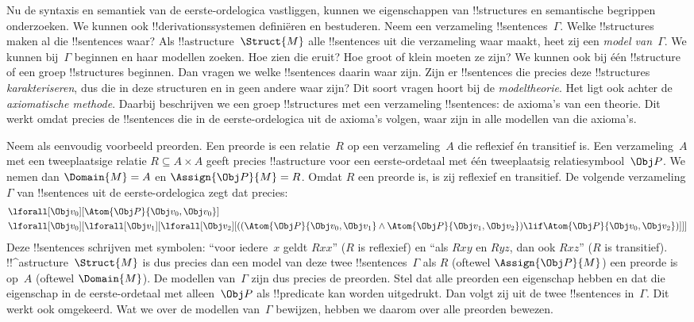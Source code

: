 \documentclass[../../../include/open-logic-section]{subfiles}
\begin{document}


Nu de syntaxis en semantiek van de eerste-ordelogica vastliggen, kunnen
we eigenschappen van !!{structure}s en semantische begrippen
onderzoeken. We kunnen ook !!{derivation}ssystemen definiëren en
bestuderen. Neem een verzameling !!{sentence}s~$\Gamma$. Welke
!!{structure}s maken al die !!{sentence}s waar? Als
!!a{structure}~$\Struct{M}$ alle !!{sentence}s uit die verzameling waar maakt, heet zij een
\emph{model van~$\Gamma$}.
We kunnen bij~$\Gamma$ beginnen en haar modellen zoeken. Hoe zien die
eruit? Hoe groot of klein moeten ze zijn? We kunnen ook bij één
!!{structure} of een groep !!{structure}s beginnen. Dan vragen we welke
!!{sentence}s daarin waar zijn. Zijn er !!{sentence}s die precies deze
!!{structure}s \emph{karakteriseren}, dus die in deze structuren en in
geen andere waar zijn? Dit soort vragen hoort bij de \emph{modeltheorie}.
Het ligt ook achter de \emph{axiomatische methode}. Daarbij beschrijven
we een groep !!{structure}s met een verzameling !!{sentence}s: de
axioma's van een theorie. Dit werkt omdat precies de !!{sentence}s die
in de eerste-ordelogica uit de axioma's volgen, waar zijn in alle
modellen van die axioma's.

Neem als eenvoudig voorbeeld preorden. Een preorde is een relatie~$R$
op een verzameling~$A$ die reflexief én transitief is. Een
verzameling~$A$ met een tweeplaatsige relatie
$R \subseteq A \times A$ geeft precies !!a{structure} voor een
eerste-ordetaal met één tweeplaatsig relatiesymbool~$\Obj P$. We nemen
dan $\Domain{M} = A$ en $\Assign{\Obj P}{M} = R$. Omdat $R$ een
preorde is, is zij reflexief en transitief. De volgende verzameling
$\Gamma$ van !!{sentence}s uit de eerste-ordelogica zegt dat precies:
\begin{align*}
  & \lforall[\Obj v_0][\Atom{\Obj P}{\Obj v_0,\Obj v_0}]\\
  & \lforall[\Obj v_0][\lforall[\Obj v_1][\lforall[\Obj v_2][((\Atom{\Obj P}{\Obj v_0,\Obj v_1} \land \Atom{\Obj P}{\Obj v_1,\Obj v_2}) \lif \Atom{\Obj P}{\Obj v_0,\Obj v_2})]]]
\end{align*}
Deze !!{sentence}s schrijven met symbolen: ``voor iedere~$x$ geldt
$Rxx$'' ($R$ is reflexief) en ``als $Rxy$ en $Ryz$, dan ook $Rxz$''
($R$ is transitief). !!^a{structure}~$\Struct{M}$ is dus precies dan
een model van deze twee !!{sentence}s~$\Gamma$ als $R$ (oftewel
$\Assign{\Obj P}{M}$) een preorde is op~$A$ (oftewel $\Domain{M}$).
De modellen van~$\Gamma$ zijn dus precies de preorden. Stel dat alle
preorden een eigenschap hebben en dat die eigenschap in de
eerste-ordetaal met alleen~$\Obj P$ als !!{predicate} kan worden
uitgedrukt. Dan volgt zij uit de twee !!{sentence}s in~$\Gamma$. Dit
werkt ook omgekeerd. Wat we over de modellen van~$\Gamma$ bewijzen,
hebben we daarom over alle preorden bewezen.
\end{document}
